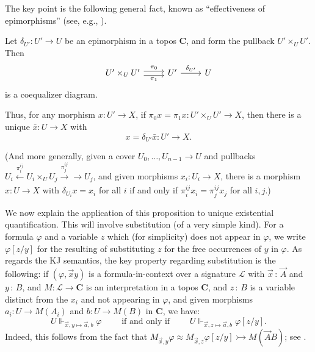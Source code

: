 \documentclass{amsart}
\newcommand\bC{\mathbf{C}}
\newcommand\cL{\mathcal{L}}
\newcommand\IFF{\text{ if and only if }}
\renewcommand\phi{\varphi}
\newcommand\tolon{{\,:\,}}
\newcommand\tox[2][]{\xrightarrow[#1]{#2}}
\newcommand\tto{\rightarrowtail}
\newcommand\vA{\vek{A}}
\newcommand\va{\vek{a}}
\newcommand\vek[1]{{\vec{#1}}}
\newcommand\vx{\vek{x}}
\newcommand\xot[2][]{\xleftarrow[#1]{#2}}
\theoremstyle{definition}
\theoremstyle{remark}
\theoremstyle{plainwithref}
\begin{document}
The key point is the following general fact, known as ``effectiveness of epimorphisms'' (see, e.g., \cite[Corollary~C2.1.12~(d)]{johnstone-topos-theory}).
\begin{propn} \label{propn:epis-eff}
  Let \( \delta_{U'} \colon U' \to U \) be an epimorphism in a topos \( \bC \), and form the pullback \( U' \times_U U' \).
  Then
  \[
    \begin{tikzcd}
      U' \times_U U' \ar[r, shift left, "\pi_0"] \ar[r, shift right, "\pi_1"'] & U' \ar[r, "\delta_{U'}"] & U
    \end{tikzcd}
  \]
  is a coequalizer diagram.

  Thus, for any morphism \( x \colon U' \to X \), if \( \pi_0 x = \pi_1 x \colon U' \times_U U' \to X \), then there is a unique \( \bar x \colon U \to X \) with
  \[
    x = \delta_{U'} \bar x \colon U' \to X.
  \]

  (And more generally, given a cover \( U_0, \ldots, U_{n-1} \to U \) and pullbacks \( U_i \xot{\pi_i^{ij}} U_i \times_U U_j \tox{\pi_j^{ij}} \to U_j \), and given morphisms \( x_i \colon U_i \to X \), there is a morphism \( x \colon U \to X \) with \( \delta_{U_i} x = x_i \) for all \( i \) if and only if \( \pi^{ij}_i x_i = \pi^{ij}_j x_j \) for all \( i,j \).)
\end{propn}

We now explain the application of this proposition to unique existential quantification.
This will involve substitution (of a very simple kind).
For a formula \( \phi \) and a variable \( z \) which (for simplicity) does not appear in \( \phi \), we write \( \phi[z/y] \) for the resulting of substituting \( z \) for the free occurrences of \( y \) in \( \phi \).
As regards the KJ semantics, the key property regarding substitution is the following:
if \( (\phi, \vx y) \) is a formula-in-context over a signature \( \cL \) with \( \vx \tolon \vA \) and \( y \tolon B \), and \( M \colon \cL \to \bC \) is an interpretation in a topos \( \bC \), and \( z \tolon B \) is a variable distinct from the \( x_i \) and not appearing in \( \phi \), and given morphisms \( a_i \colon U \to M(A_i) \) and \( b \colon U \to M(B) \) in \( \bC \), we have:
\begin{equation}\label{eq:subst-and-kj}
  U \Vdash_{\vx,y \mapsto \va,b} \phi
  \qquad
  \IFF
  \qquad
  U \Vdash_{\vx,z \mapsto \va,b} \phi[z/y].
\end{equation}
Indeed, this follows from the fact that \( M_{\vx, y} \phi \approx M_{\vx, z} \phi[z / y] \tto M(\vA B) \); see \cite[Lemma~3.2.3]{makkai-reyes-focl}.
\end{document}
